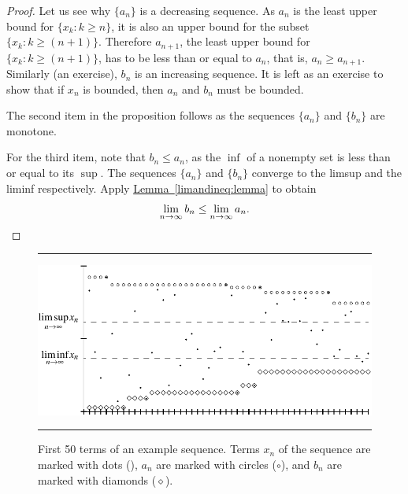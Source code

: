 \documentclass[12pt]{book}
\newenvironment{myfigureht}{%
\begin{figure}[h!t]
\noindent\rule{\textwidth}{0.4pt}\vspace{12pt}\par\centering}%
{\par\noindent\rule{\textwidth}{0.4pt}
\end{figure}}
\theoremstyle{plain}
\theoremstyle{remark}
\theoremstyle{definition}
\theoremstyle{exercise}
\theoremstyle{example}
\newcommand{\lemmaref}[1]{\hyperref[#1]{Lemma~\ref*{#1}}}
\begin{document}
\begin{proof}
Let us see why $\{ a_n \}$ is a decreasing sequence.  As $a_n$ is the least upper
bound for $\{ x_k : k \geq n \}$, it is also
an upper bound for the subset $\{ x_k : k \geq (n+1) \}$.  Therefore
$a_{n+1}$, the least upper bound for
$\{ x_k : k \geq (n+1) \}$, has to be less than or equal to $a_n$,
that is,
$a_n \geq a_{n+1}$.  Similarly (an exercise), $b_n$ is an increasing
sequence.  It is left as an exercise to show that
if $x_n$ is bounded, then $a_n$ and $b_n$ must be bounded.

The second item in the proposition follows as the sequences
$\{ a_n \}$ and $\{ b_n \}$ are monotone.

For the third item, note that $b_n \leq a_n$, as the $\inf$ of a nonempty set
is less than or equal to its $\sup$.  The sequences $\{ a_n \}$ and $\{ b_n \}$
converge to the limsup and the liminf respectively.
Apply \lemmaref{limandineq:lemma} to obtain
\begin{equation*}
\lim_{n\to \infty} b_n \leq \lim_{n\to \infty} a_n.  \qedhere
\end{equation*}
\end{proof}
\begin{myfigureht}
\includegraphics{figures/sequence-limsupliminf_an_bn}
\caption{First 50 terms of an example sequence.  Terms $x_n$ of the sequence are
marked with dots (\raisebox{0.25ex}{\tiny$\bullet$}), $a_n$ are marked with
circles ($\circ$), and
$b_n$ are marked with diamonds ($\diamond$).\label{sequence-limsupliminf_an_bn}}
\end{myfigureht}
\end{document}

